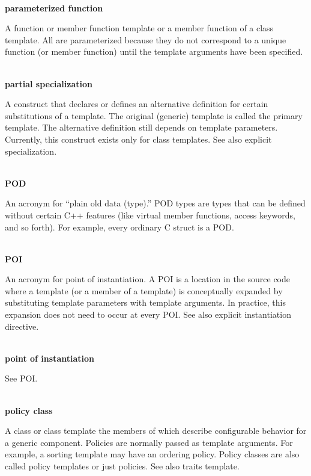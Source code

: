 \hspace*{\fill} \\ %
\noindent
\textbf{parameterized function}

A function or member function template or a member function of a class template. All are parameterized because they do not correspond to a unique function (or member function) until the template arguments have been specified.

\hspace*{\fill} \\ %
\noindent
\textbf{partial specialization}

A construct that declares or defines an alternative definition for certain substitutions of a template. The original (generic) template is called the primary template. The alternative definition still depends on template parameters. Currently, this construct exists only for class templates. See also explicit specialization.

\hspace*{\fill} \\ %
\noindent
\textbf{POD}

An acronym for “plain old data (type).” POD types are types that can be defined without certain C++ features (like virtual member functions, access keywords, and so forth). For example, every ordinary C struct is a POD.

\hspace*{\fill} \\ %
\noindent
\textbf{POI}

An acronym for point of instantiation. A POI is a location in the source code where a template (or a member of a template) is conceptually expanded by substituting template parameters with template arguments. In practice, this expansion does not need to occur at every POI. See also explicit instantiation directive.

\hspace*{\fill} \\ %
\noindent
\textbf{point of instantiation}

See POI.

\hspace*{\fill} \\ %
\noindent
\textbf{policy class}

A class or class template the members of which describe configurable behavior for a generic component. Policies are normally passed as template arguments. For example, a sorting template may have an ordering policy. Policy classes are also called policy templates or just policies. See also traits template.

